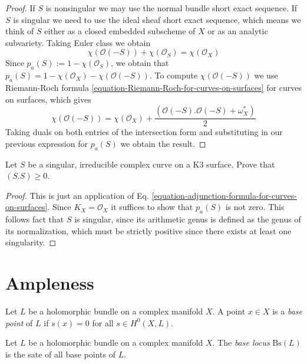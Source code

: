 \begin{proof}
If $S$ is nonsingular we may use the normal bundle short exact sequence. If
$S$ is singular we need to use the ideal sheaf short exact sequence, which means
we think of $S$ either as a closed embedded subscheme of $X$ or as an analytic 
subvariety. Taking Euler class we obtain
$$
\chi(\mathcal{O}(-S))+\chi(\mathcal{O}_S)=\chi(\mathcal{O}_X)
$$
Since $p_a(S):=1-\chi(\mathcal{O}_S)$, we obtain that
$p_a(S)=1-\chi(\mathcal{O}_X)-\chi(\mathcal{O}(-S))$. To compute
$\chi(\mathcal{O}(-S))$ we use Riemann-Roch formula
\ref{equation-Riemann-Roch-for-curves-on-surfaces} for curves on surfaces, which
gives
$$
\chi(\mathcal{O}(-S))=\chi(\mathcal{O}_X)
+\frac{(\mathcal{O}(-S).\mathcal{O}(-S)+\omega_X^*)}{2}
$$
Taking duals on both entries of the intersection form and substituting in our
previous expression for $p_a(S)$ we obtain the result.
\end{proof}

\begin{exercise}
\label{exercise-singular-curve-on-K3-has-positive-self-intersection}
Let $S$ be a singular, irreducible complex curve on a K3 surface. Prove that
$(S.S)\geq 0$.
\end{exercise}

\begin{proof}
This is just an application of Eq.
\ref{equation-adjunction-formula-for-curves-on-surfaces}. Since
$K_X=\mathcal{O}_X$ it suffices to show that $p_a(S)$ is not zero. This follows
fact that $S$ is singular, since its arithmetic genus is defined as the genus of
its normalization, which must be strictly positive since there exists at least
one singularity.
\end{proof}

\section{Ampleness}
\label{section-ampleness}

\begin{definition}
\label{definition-base-point}
\begin{reference}
\cite[Definition 2.3.25]{huc}
\end{reference}
Let $L$ be a holomorphic bundle on a complex manifold $X$. A point $x \in X$ is
a {\it base point} of $L$ if $s(x)=0$ for all $s\in H^{0}(X,L)$. 
\end{definition}

\begin{definition}
\label{definition-base-locus}
\begin{reference}
\cite[Definition 2.3.25]{huc}
\end{reference}
Let $L$ be a holomorphic bundle on a complex manifold $X$. 
The {\it base locus} $\text{Bs}(L)$ is the sate of all base points of $L$.
\end{definition}

